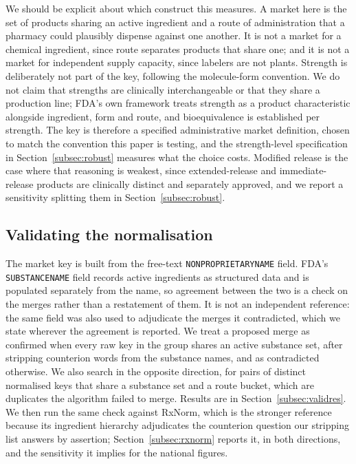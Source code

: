 \documentclass[pdflatex,sn-vancouver-num,Numbered]{sn-jnl}
\begin{document}
We should be explicit about which construct this measures. A market here is the set of products
sharing an active ingredient and a route of administration that a pharmacy could plausibly
dispense against one another. It is not a market for a chemical ingredient, since route
separates products that share one; and it is not a market for independent supply capacity, since
labelers are not plants. Strength is deliberately not part of the key, following the
molecule-form convention. We do not claim that strengths are clinically interchangeable or that
they share a production line; FDA's own framework treats strength as a product characteristic
alongside ingredient, form and route, and bioequivalence is established per strength. The key is
therefore a specified administrative market definition, chosen to match the convention this
paper is testing, and the strength-level specification in Section~\ref{subsec:robust} measures
what the choice costs. Modified
release is the case where that reasoning is weakest, since extended-release and immediate-release
products are clinically distinct and separately approved, and we report a sensitivity splitting
them in Section~\ref{subsec:robust}.

\subsection{Validating the normalisation}\label{subsec:validate}

The market key is built from the free-text \texttt{NONPROPRIETARYNAME} field. FDA's
\texttt{SUBSTANCENAME} field records active ingredients as structured data and is populated
separately from the name, so agreement between the two is a check on the merges rather than a
restatement of them. It is not an independent reference: the same field was also used to
adjudicate the merges it contradicted, which we state wherever the agreement is reported. We treat a proposed merge as confirmed when every raw key in the group shares an active
substance set, after stripping counterion words from the substance names, and as contradicted
otherwise. We also search in the opposite direction, for pairs of distinct normalised keys that
share a substance set and a route bucket, which are duplicates the algorithm failed to merge.
Results are in Section~\ref{subsec:validres}. We then run the same check against RxNorm, which
is the stronger reference because its ingredient hierarchy adjudicates the counterion question
our stripping list answers by assertion; Section~\ref{subsec:rxnorm} reports it, in both
directions, and the sensitivity it implies for the national figures.
\end{document}

